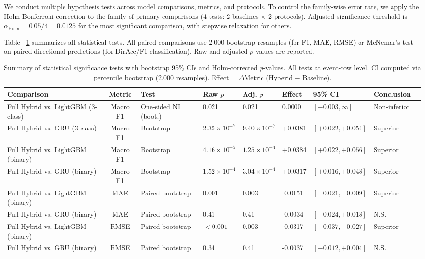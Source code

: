 \documentclass[runningheads]{llncs}
\begin{document}
We conduct multiple hypothesis tests across model comparisons, metrics, and protocols. To control the family-wise error rate, we apply the Holm-Bonferroni correction to the family of primary comparisons (4 tests: 2 baselines $\times$ 2 protocols). Adjusted significance threshold is $\alpha_{\text{Holm}} = 0.05 / 4 = 0.0125$ for the most significant comparison, with stepwise relaxation for others.

Table~
\ref{tabstatistical-tests} summarizes all statistical tests. All paired comparisons use 2,000 bootstrap resamples (for F1, MAE, RMSE) or McNemar's test on paired directional predictions (for DirAcc/F1 classification). Raw and adjusted $p$-values are reported.

\begin{table}[htbp]
\centering
\caption{Summary of statistical significance tests with bootstrap 95\% CIs and Holm-corrected $p$-values. All tests at event-row level. CI computed via percentile bootstrap (2,000 resamples). Effect = $\Delta$Metric (Hyperid $-$ Baseline).}
\label{tabstatistical-tests}
\small
\begin{tabular}{lcp{1.2cm}p{1.2cm}p{1.2cm}p{1.8cm}p{2cm}p{1.5cm}c}
\toprule
Comparison & Metric & Test & Raw $p$ & Adj. $p$ & Effect & 95\% CI & Conclusion \\
\midrule
Full Hybrid vs. LightGBM (3-class) & Macro F1 & One-sided NI (boot.) & 0.021 & 0.021 & 0.0000 & $[-0.003, \infty]$ & Non-inferior \\
Full Hybrid vs. GRU (3-class) & Macro F1 & Bootstrap & $2.35 \times 10^{-7}$ & $9.40 \times 10^{-7}$ & +0.0381 & $[+0.022, +0.054]$ & Superior \\
Full Hybrid vs. LightGBM (binary) & Macro F1 & Bootstrap & $4.16 \times 10^{-5}$ & $1.25 \times 10^{-4}$ & +0.0384 & $[+0.022, +0.056]$ & Superior \\
Full Hybrid vs. GRU (binary) & Macro F1 & Bootstrap & $1.52 \times 10^{-4}$ & $3.04 \times 10^{-4}$ & +0.0317 & $[+0.016, +0.048]$ & Superior \\
\midrule
Full Hybrid vs. LightGBM (binary) & MAE & Paired bootstrap & 0.001 & 0.003 & -0.0151 & $[-0.021, -0.009]$ & Superior \\
Full Hybrid vs. GRU (binary) & MAE & Paired bootstrap & 0.41 & 0.41 & -0.0034 & $[-0.024, +0.018]$ & N.S. \\
Full Hybrid vs. LightGBM (binary) & RMSE & Paired bootstrap & $<0.001$ & 0.003 & -0.0317 & $[-0.037, -0.027]$ & Superior \\
Full Hybrid vs. GRU (binary) & RMSE & Paired bootstrap & 0.34 & 0.41 & -0.0037 & $[-0.012, +0.004]$ & N.S. \\
\bottomrule
\end{tabular}
\end{table}
\end{document}
